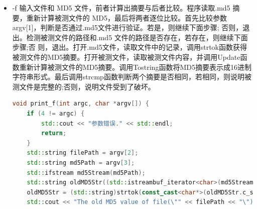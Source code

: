\documentclass[UTF8,a4paper,10pt]{ctexart}
\begin{document}
\begin{itemize}
    首先比较参数argv[1]，判断是否通过手工输入进行验证。若是，则继续下面步骤;否则，退出。检测被测文件的路径是否存在，若存在，则继续下面步骤;否则，退出。输入被测文件的MD5摘要并保存在数组InputMD5中。打开被测文件，读取被测文件内容，并调用Update函数重新计算被测文件的MD5摘要。调用Tostring函数将MD5摘要表示成16进制字符串形式。最后调用strcmp函数判断两个摘要是否相同，若相同，则说明被测文件是完整的；否则，说明文件受到了破坏。
    \begin{lstlisting}[language = C++]
void print_v(int argc,char *argv[]) {
    if (3 != argc) {
        std::cout << "参数错误." << std::endl;
        return;
    }
    std::string filePath = argv[2];
    std::cout << "Please input the MD5 value of file(\"" << filePath << "\")..." << std::endl;
    std::string inputMD5;
    std::cin >> inputMD5;
    std::cout << "The old MD5 value of file(\"" << filePath << "\") you have input is" << std::endl << inputMD5 << std::endl;
    std::ifstream fileStream(filePath);
    MD5 md5;
    md5.Update(fileStream);
    std::string genMD5 = md5.Tostring();
    std::cout << "The new MD5 value of file(\"" << filePath << "\") that has computed is" << std::endl << genMD5 << std::endl;
    if (!genMD5.compare(inputMD5)) {
        std::cout << "OK! The file is integrated" << std::endl;
    }
    else {
        std::cout << "Match Error! The file has been modified!" << std::endl;
    }
}
    \end{lstlisting}
    \item -f 输入文件和 MD5 文件，前者计算出摘要与后者比较。程序读取.md5 摘要，重新计算被测文件的 MD5，最后将两者逐位比较。首先比较参数argv[1]，判断是否通过.md5文件进行验证。若是，则继续下面步骤; 否则，退出。检测被测文件的路径和.md5 文件的路径是否存在，若存在，则继续下面步骤;否 则，退出。打开.md5文件，读取文件中的记录，调用strtok函数获得被测文件的MD5摘要。打开被测文件，读取被测文件内容，并调用Update函数重新计算被测文件的MD5摘要。调用Tostring函数将MD5摘要表示成16进制字符串形式。最后调用strcmp函数判断两个摘要是否相同，若相同，则说明被测文件是完整的;否则，说明文件受到了破坏。
    \begin{lstlisting}[language = C++]
void print_f(int argc, char *argv[]) {
    if (4 != argc) {
        std::cout << "参数错误." << std::endl;
        return;
    }
    std::string filePath = argv[2];
    std::string md5Path = argv[3];
    std::ifstream md5Stream(md5Path);
    std::string oldMD5Str((std::istreambuf_iterator<char>(md5Stream)), std::istreambuf_iterator<char>());
    oldMD5Str = (std::string)strtok(const_cast<char*>(oldMD5Str.c_str())," ");
    std::cout << "The old MD5 value of file(\"" << filePath << "\") in " << md5Path << " is " << std::endl << oldMD5Str << std::endl;

\end{lstlisting}
\end{itemize}
\end{document}
